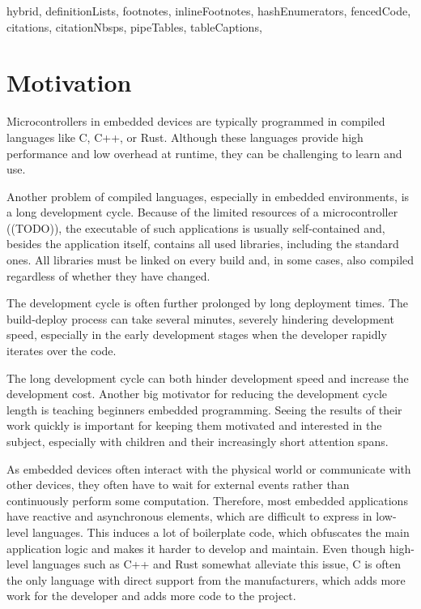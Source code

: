 \begin{markdown*}{%
  hybrid,
  definitionLists,
  footnotes,
  inlineFootnotes,
  hashEnumerators,
  fencedCode,
  citations,
  citationNbsps,
  pipeTables,
  tableCaptions,
}

\chapter{Motivation}

Microcontrollers in embedded devices are typically programmed in compiled languages like C, C++, or Rust. Although these languages provide high performance and low overhead at runtime, they can be challenging to learn and use.

Another problem of compiled languages, especially in embedded environments, is a long development cycle. Because of the limited resources of a microcontroller ((TODO)), the executable of such applications is usually self-contained and, besides the application itself, contains all used libraries, including the standard ones. All libraries must be linked on every build and, in some cases, also compiled regardless of whether they have changed.

The development cycle is often further prolonged by long deployment times. The build-deploy process can take several minutes, severely hindering development speed, especially in the early development stages when the developer rapidly iterates over the code.

The long development cycle can both hinder development speed and increase the development cost. Another big motivator for reducing the development cycle length is teaching beginners embedded programming. Seeing the results of their work quickly is important for keeping them motivated and interested in the subject, especially with children and their increasingly short attention spans.

As embedded devices often interact with the physical world or communicate with other devices, they often have to wait for external events rather than continuously perform some computation. Therefore, most embedded applications have reactive and asynchronous elements, which are difficult to express in low-level languages. This induces a lot of boilerplate code, which obfuscates the main application logic and makes it harder to develop and maintain. Even though high-level languages such as C++ and Rust somewhat alleviate this issue, C is often the only language with direct support from the manufacturers, which adds more work for the developer and adds more code to the project.



\end{markdown*}
